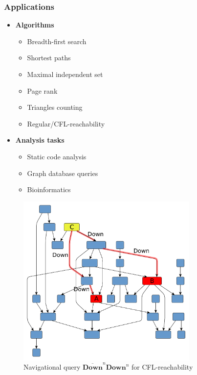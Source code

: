 \documentclass[aspectratio=169,xcolor=table,english]{beamer}
\begin{document}
\begin{frame}[fragile] \frametitle{Applications}
    \begin{minipage}[m]{0.5\linewidth}
        \begin{itemize}
            \item \textbf{Algorithms}
            {
            \begin{itemize}
                \item Breadth-first search
                \item Shortest paths
                \item Maximal independent set
                \item Page rank
                \item Triangles counting 
                \item Regular/CFL-reachability
            \end{itemize}
            }
            \item \textbf{Analysis tasks}
            {
            \begin{itemize}
                \item Static code analysis
                \item Graph database queries
                \item Bioinformatics
            \end{itemize}
            }
        \end{itemize}
    \end{minipage}\hfill
    \begin{minipage}[m]{0.5\linewidth}
        \begin{figure}
            \centering
            \includegraphics[width=0.8\textwidth]{pictures/hierarchical.pdf}
            \caption{Navigational query $\overline{\textbf{Down}}^n$$\textbf{Down}^n$ for CFL-reachability}
            \label{fig:navigation}
        \end{figure}
    \end{minipage}
\end{frame}
\end{document}
